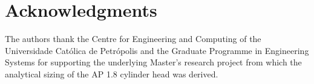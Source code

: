 \documentclass[preprint,12pt,a4paper]{elsarticle}
\let\oldsection\section
\renewcommand\section{\FloatBarrier\oldsection}
\begin{document}
\section*{Acknowledgments}
The authors thank the Centre for Engineering and Computing of the
Universidade Cat\'olica de Petr\'opolis and the Graduate Programme in
Engineering Systems for supporting the underlying Master's research
project from which the analytical sizing of the AP 1.8 cylinder
head was derived.




\end{document}
